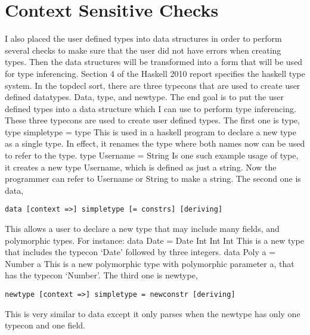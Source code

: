 \chapter{Context Sensitive Checks}
I also placed the user defined types into data structures in order to perform several checks to make sure that the user did not have errors when creating types. Then the data structures will be transformed into a form that will be used for type inferencing.
Section 4 of the Haskell 2010 report specifies the haskell type system.
In the topdecl sort, there are three typecons that are used to create user defined datatypes. Data, type, and newtype. The end goal is to put the user defined types into a data structure which I can use to perform type inferencing. These three typecons are used to create user defined types.
The first one is type,
type simpletype = type 
This is used in a haskell program to declare a new type as a single type. In effect, it renames the type where both names now can be used to refer to the type.
type Username = String
Is one such example usage of type, it creates a new type Username, which is defined as just a string. Now the programmer can refer to Username or String to make a string.
	The second one is data,
	\begin{lstlisting}
data [context =>] simpletype [= constrs] [deriving]
	\end{lstlisting}
This allows a user to declare a new type that may include many fields, and polymorphic types. For instance:
data Date = Date Int Int Int
This is a new type that includes the typecon ‘Date’ followed by three integers.
data Poly a = Number a
This is a new polymorphic type with polymorphic parameter a, that has the typecon ‘Number’.
	The third one is newtype,
	\begin{lstlisting}
newtype [context =>] simpletype = newconstr [deriving]
\end{lstlisting}
This is very similar to data except it only parses when the newtype has only one typecon and one field.

